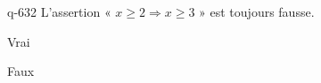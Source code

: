 \begin{truefalse}{q-632}
L'assertion « $x\geq 2 \Rightarrow x \geq 3$ » est toujours fausse.
\item Vrai
\item* Faux
\end{truefalse}

